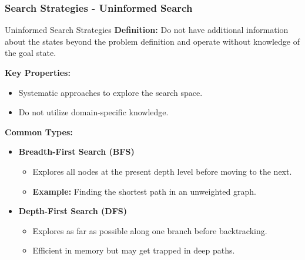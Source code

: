 \documentclass[aspectratio=169]{beamer}
\begin{document}
\begin{frame}[fragile]
    \frametitle{Search Strategies - Uninformed Search}
    \begin{block}{Uninformed Search Strategies}
        \textbf{Definition:} Do not have additional information about the states beyond the problem definition and operate without knowledge of the goal state.
        
        \textbf{Key Properties:}
        \begin{itemize}
            \item Systematic approaches to explore the search space.
            \item Do not utilize domain-specific knowledge.
        \end{itemize}

        \textbf{Common Types:}
        \begin{itemize}
            \item \textbf{Breadth-First Search (BFS)}
            \begin{itemize}
                \item Explores all nodes at the present depth level before moving to the next.
                \item \textbf{Example:} Finding the shortest path in an unweighted graph.
            \end{itemize}

            \item \textbf{Depth-First Search (DFS)}
            \begin{itemize}
                \item Explores as far as possible along one branch before backtracking.
                \item Efficient in memory but may get trapped in deep paths.
            \end{itemize}
        \end{itemize}
    \end{block}
\end{frame}
\end{document}
